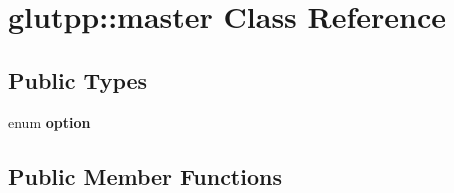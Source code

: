 \hypertarget{classglutpp_1_1master}{\section{glutpp\-:\-:master \-Class \-Reference}
\label{classglutpp_1_1master}
}
\subsection*{\-Public \-Types}
\begin{DoxyCompactItemize}
\item 
enum {\bfseries option} 
\end{DoxyCompactItemize}
\subsection*{\-Public \-Member \-Functions}
